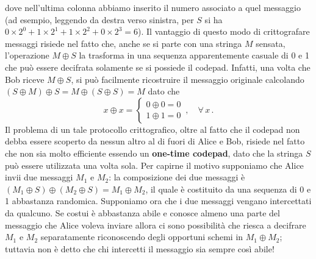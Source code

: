 \noindent dove nell'ultima colonna abbiamo inserito il numero associato a quel messaggio (ad esempio, leggendo da destra verso sinistra, per $S$ si ha $0 \times 2^0 + 1 \times 2^1 + 1 \times 2^2 + 0 \times 2^3 = 6$). Il vantaggio di questo modo di crittografare messaggi risiede nel fatto che, anche se si parte con una stringa $M$ sensata, l'operazione $M \oplus S$ la trasforma in una sequenza apparentemente casuale di 0 e 1 che può essere decifrata solamente se si possiede il codepad. Infatti, una volta che Bob riceve $M \oplus S$, si può facilmente ricostruire il messaggio originale calcolando $(S \oplus M) \oplus S = M \oplus (S \oplus S) = M$ dato che 
\begin{equation*}
    x \oplus x =
    \begin{cases}
        0 \oplus 0 = 0 \\
        1 \oplus 1 = 0 
    \end{cases} \, , \quad \forall \, x \, .
\end{equation*}
Il problema di un tale protocollo crittografico, oltre al fatto che il codepad non debba essere scoperto da nessun altro al di fuori di Alice e Bob, risiede nel fatto che non sia molto efficiente essendo un \textbf{one-time codepad}, dato che la stringa $S$ può essere utilizzata una volta sola. Per capirne il motivo supponiamo che Alice invii due messaggi $M_1$ e $M_2$: la composizione dei due messaggi  è $(M_1 \oplus S) \oplus (M_2 \oplus S) = M_1 \oplus M_2$, il quale è costituito da una sequenza di 0 e 1 abbastanza randomica. Supponiamo ora che i due messaggi vengano intercettati da qualcuno. Se costui è abbastanza abile e conosce almeno una parte del messaggio che Alice voleva inviare allora ci sono possibilità che riesca a decifrare $M_1$ e $M_2$ separatamente riconoscendo degli opportuni schemi in $M_1 \oplus M_2$; tuttavia non è detto che chi intercetti il messaggio sia sempre così abile!


